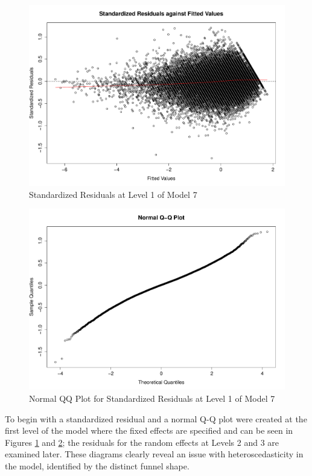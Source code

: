 \documentclass[11pt,a4paper]{report}
\begin{document}
\begin{figure}[H]
	\centering
	\includegraphics[width=0.95\linewidth]{images/SresidvfittedMLM}
	\caption{Standardized Residuals at Level 1 of Model 7}
	\label{fig:SresidvfittedMLM}
\end{figure}
\begin{figure}[H]
	\centering
	\includegraphics[width=0.95\linewidth]{images/qqplotmodel7}
	\caption{Normal QQ Plot for Standardized Residuals at Level 1 of Model 7}
	\label{fig:qqplotmodel7}
\end{figure}


To begin with a standardized residual and a normal Q-Q plot were created at the first level of the model where the fixed effects are specified and can be seen in Figures \ref{fig:SresidvfittedMLM} and \ref{fig:qqplotmodel7}; the residuals for the random effects at Levels 2 and 3 are examined later. These diagrams clearly reveal an issue with heteroscedasticity in the model, identified by the distinct funnel shape. 
\end{document}
